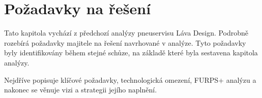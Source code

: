 \chapter{Požadavky na řešení}
Tato kapitola vychází z předchozí analýzy pneuservisu Láva Design. Podrobně rozebírá požadavky majitele na řešení navrhované v analýze. Tyto požadavky byly identifikovány během stejné schůze, na základě které byla sestavena kapitola analýzy. 

Nejdříve popisuje klíčové požadavky, technologická omezení, FURPS+ analýzu a nakonec se věnuje vizi a strategii jejího naplnění.



